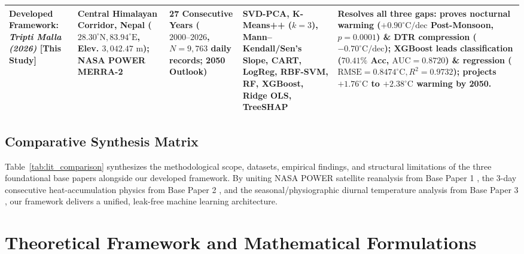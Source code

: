 \documentclass[conference]{IEEEtran}
\begin{document}
\begin{table}[!t]
\begin{tabularx}{\textwidth}{p{2.3cm} p{2.4cm} p{2.5cm} p{2.8cm} X}
\textbf{Developed Framework:} \textit{Tripti Malla (2026)} [This Study] & Central Himalayan Corridor, Nepal ($28.30^\circ\text{N}, 83.94^\circ\text{E}$, Elev. $3,042.47\text{ m}$); NASA POWER MERRA-2 & 27 Consecutive Years ($2000\text{--}2026$, $N = 9,763$ daily records; 2050 Outlook) & SVD-PCA, K-Means++ ($k=3$), Mann--Kendall/Sen's Slope, CART, LogReg, RBF-SVM, RF, XGBoost, Ridge OLS, TreeSHAP & Resolves all three gaps: proves nocturnal warming ($+0.90^\circ\text{C/dec}$ Post-Monsoon, $p=0.0001$) \& DTR compression ($-0.70^\circ\text{C/dec}$); XGBoost leads classification ($70.41\%$ Acc, $\text{AUC}=0.8720$) \& regression ($\text{RMSE}=0.8474^\circ\text{C}, R^2=0.9732$); projects $+1.76^\circ\text{C}$ to $+2.38^\circ\text{C}$ warming by 2050. \\
\bottomrule
\end{tabularx}
\end{table}

\subsection{Comparative Synthesis Matrix}
Table~\ref{tab:lit_comparison} synthesizes the methodological scope, datasets, empirical findings, and structural limitations of the three foundational base papers alongside our developed framework. By uniting NASA POWER satellite reanalysis from Base Paper 1 \cite{nepal2025}, the 3-day consecutive heat-accumulation physics from Base Paper 2 \cite{bhattarai2022}, and the seasonal/physiographic diurnal temperature analysis from Base Paper 3 \cite{sapkota2007}, our framework delivers a unified, leak-free machine learning architecture.

\section{Theoretical Framework and Mathematical Formulations}
\end{document}
